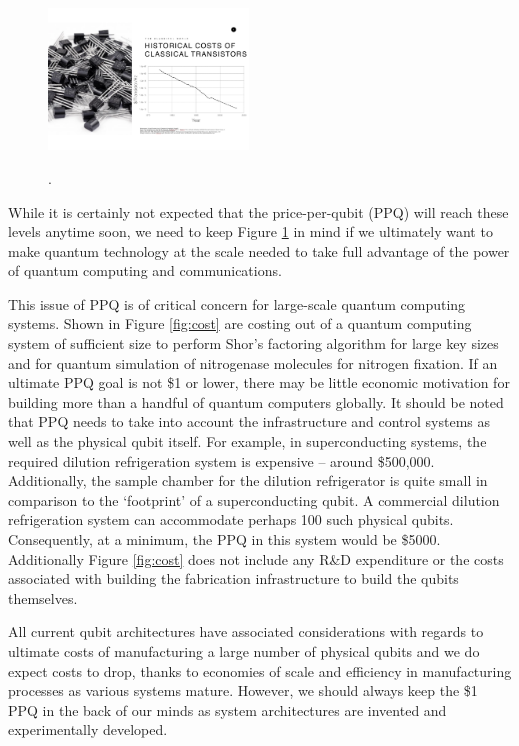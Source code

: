 \documentclass[twocolumn, aps, rmp, amsmath, amssymb, nofootinbib, superscriptaddress, longbibliography, floatfix, table-of-contents, eqsecnum]{revtex4-2}
\begin{document}
\begin{figure}[htbp!]
	\includegraphics[clip=true, width=0.475\textwidth]{cost}
	\caption{}
	\label{fig:price}.
\end{figure}

While it is certainly not expected that the price-per-qubit (PPQ) will reach these levels anytime soon, we need to keep Figure \ref{fig:price} in mind if we ultimately want to make quantum technology at the scale needed to take full advantage of the power of quantum computing and communications. 

This issue of PPQ is of critical concern for large-scale quantum computing systems. Shown in Figure \ref{fig:cost} are costing out of a quantum computing system of sufficient size to perform Shor's factoring algorithm for large key sizes and for quantum simulation of nitrogenase molecules for nitrogen fixation. If an ultimate PPQ goal is not \$1 or lower, there may be little economic motivation for building more than a handful of quantum computers globally. It should be noted that PPQ needs to take into account the infrastructure and control systems as well as the physical qubit itself. For example, in superconducting systems, the required dilution refrigeration system is expensive -- around \$500,000. Additionally, the sample chamber for the dilution refrigerator is quite small in comparison to the `footprint' of a superconducting qubit. A commercial dilution refrigeration system can accommodate perhaps 100 such physical qubits. Consequently, at a minimum, the PPQ in this system would be \$5000.  Additionally Figure \ref{fig:cost} does not include any R\&D expenditure or the costs associated with building the fabrication infrastructure to build the qubits themselves. 

All current qubit architectures have associated considerations with regards to ultimate costs of manufacturing a large number of physical qubits and we do expect costs to drop, thanks to economies of scale and efficiency in manufacturing processes as various systems mature. However, we should always keep the \$1 PPQ in the back of our minds as system architectures are invented and experimentally developed. 
\end{document}
